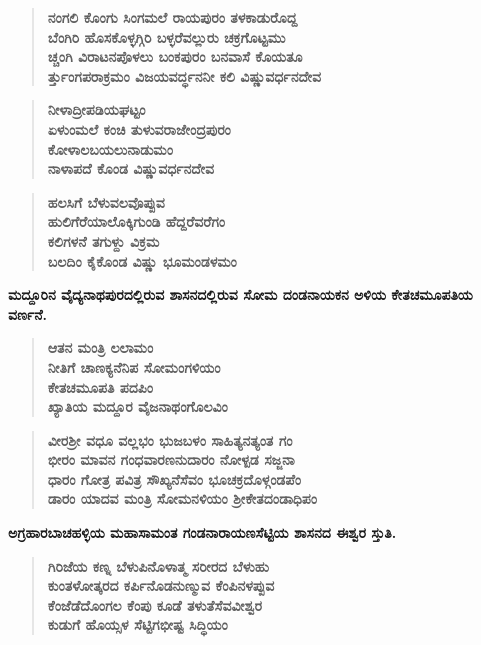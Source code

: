 \begin{verse}
\textbf{ನಂಗಲಿ ಕೊಂಗು ಸಿಂಗಮಲೆ ರಾಯಪುರಂ ತಳಕಾಡುರೊದ್ದ \\ ಬೆಂಗಿರಿ ಹೊಸಕೊಳ್ಳಗ್ಗಿರಿ ಬಳ್ಳರೆವಲ್ಲುರು ಚಕ್ರಗೊಟ್ಟಮು \\ ಚ್ಚಂಗಿ ವಿರಾಟನಪೊಳಲು ಬಂಕಪುರಂ ಬನವಾಸೆ ಕೊಯತೂ \\ರ್ತ್ತುಂಗಪರಾಕ್ರಮಂ ವಿಜಯವರ್ದ್ಧನನೀ ಕಲಿ ವಿಷ್ಣುವರ್ಧನದೇವ}
\end{verse}

\begin{verse}
\textbf{ನೀಳಾದ್ರೀಪಡಿಯಘಟ್ಟಂ \\ ಏಳುಂಮಲೆ ಕಂಚಿ ತುಳುವರಾಜೇಂದ್ರಪುರಂ \\ ಕೋಳಾಲಬಯಲುನಾಡುಮಂ \\ ನಾಳಾಪದೆ ಕೊಂಡ ವಿಷ್ಣುವರ್ಧನದೇವ}
\end{verse}

\begin{verse}
\textbf{ಹಲಸಿಗೆ ಬೆಳುವಲವೊಪ್ಪುವ \\ ಹುಲಿಗೆರೆಯಾಲೊಕ್ಕಿಗುಂಡಿ ಹೆದ್ದರೆವರೆಗಂ \\ ಕಲಿಗಳನೆ ತಗುಳ್ದು ವಿಕ್ರಮ \\ ಬಲದಿಂ ಕೈಕೊಂಡ ವಿಷ್ಣು ಭೂಮಂಡಳಮಂ}
\end{verse}

\noindent
\textbf{ಮದ್ದೂರಿನ ವೈದ್ಯನಾಥಪುರದಲ್ಲಿರುವ ಶಾಸನದಲ್ಲಿರುವ ಸೋಮ ದಂಡನಾಯಕನ ಅಳಿಯ ಕೇತಚಮೂಪತಿಯ ವರ್ಣನೆ.}

\begin{verse}
\textbf{ಆತನ ಮಂತ್ರಿ ಲಲಾಮಂ \\ ನೀತಿಗೆ ಚಾಣಕ್ಯನೆನಿಪ ಸೋಮಂಗಳಿಯಂ \\ ಕೇತಚಮೂಪತಿ ಪದಪಿಂ \\ ಖ್ಯಾತಿಯ ಮದ್ದೂರ ವೈಜನಾಥಂಗೊಲವಿಂ}
\end{verse}

\begin{verse}
\textbf{ವೀರಶ‍್ರೀ ವಧೂ ವಲ್ಲಭಂ ಭುಜಬಳಂ ಸಾಹಿತ್ಯನತ್ಯಂತ ಗಂ \\ ಭೀರಂ ಮಾವನ ಗಂಧವಾರಣನುದಾರಂ ನೋಳ್ಪಡ ಸಜ್ಜನಾ \\ ಧಾರಂ ಗೋತ್ರ ಪವಿತ್ರ ಸೌಖ್ಯನೆಸೆವಂ ಭೂಚಕ್ರದೊಳ್ಗಂಡಪೆಂ \\ ಡಾರಂ ಯಾದವ ಮಂತ್ರಿ ಸೋಮನಳಿಯಂ ಶ‍್ರೀಕೇತದಂಡಾಧಿಪಂ}
\end{verse}

\noindent
\textbf{ಅಗ್ರಹಾರಬಾಚಹಳ್ಳಿಯ ಮಹಾಸಾಮಂತ ಗಂಡನಾರಾಯಣಸೆಟ್ಟಿಯ ಶಾಸನದ ಈಶ್ವರ ಸ್ತುತಿ.}

\begin{verse}
\textbf{ಗಿರಿಜೆಯ ಕಣ್ನ ಬೆಳುಪಿನೊಳಾತ್ಮ ಸರೀರದ ಬೆಳುಹು \\ ಕುಂತಳೋತ್ಕರದ ಕರ್ಪಿನೊಡನುಣ್ಮುವ ಕೆಂಪಿನಳಪ್ಪುವ \\ ಕೆಂಜೆಡೆದೊಂಗಲ ಕೆಂಪು ಕೂಡೆ ತಳುತೆಸೆವವೀಶ್ವರ \\ ಕುಡುಗೆ ಹೊಯ್ಸಳ ಸೆಟ್ಟಿಗಭೀಷ್ಟ ಸಿದ್ಧಿಯಂ}
\end{verse}

